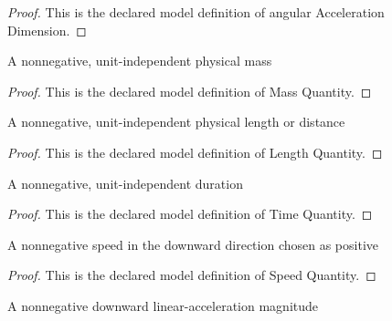 \begin{proof}
  This is the declared model definition of angular Acceleration Dimension.
\end{proof}
\begin{definition}
  \label{def:physics:phyx-mini-0771:phyxminiproblems-problemphyxmini0771-massquantity}
  A nonnegative, unit-independent physical mass
\end{definition}
\begin{proof}
  This is the declared model definition of Mass Quantity.
\end{proof}
\begin{definition}
  \label{def:physics:phyx-mini-0771:phyxminiproblems-problemphyxmini0771-lengthquantity}
  A nonnegative, unit-independent physical length or distance
\end{definition}
\begin{proof}
  This is the declared model definition of Length Quantity.
\end{proof}
\begin{definition}
  \label{def:physics:phyx-mini-0771:phyxminiproblems-problemphyxmini0771-timequantity}
  A nonnegative, unit-independent duration
\end{definition}
\begin{proof}
  This is the declared model definition of Time Quantity.
\end{proof}
\begin{definition}
  \label{def:physics:phyx-mini-0771:phyxminiproblems-problemphyxmini0771-speedquantity}
  A nonnegative speed in the downward direction chosen as positive
\end{definition}
\begin{proof}
  This is the declared model definition of Speed Quantity.
\end{proof}
\begin{definition}
  \label{def:physics:phyx-mini-0771:phyxminiproblems-problemphyxmini0771-accelerationquantity}
  A nonnegative downward linear-acceleration magnitude
\end{definition}
